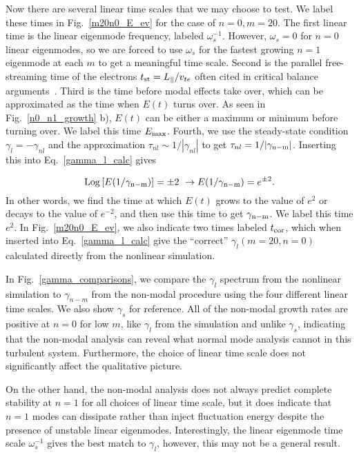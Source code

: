 \documentclass[letter,scriptaddress,twocolumn, prl,showkeys]{revtex4}
\def\beq{\begin{equation}}
\def\eeq{\end{equation}}
\def\para{\parallel}
\begin{document}
Now there are several linear time scales that we may choose to test. We label these times in Fig.~\ref{m20n0_E_ev}
for the case of $n=0, m=20$. The first linear time is the linear eigenmode frequency, labeled
$\omega_s^{-1}$. However, $\omega_s = 0$ for $n=0$ linear eigenmodes, so we are forced to use $\omega_s$ for the fastest growing $n=1$ eigenmode at each $m$ to get a meaningful time scale.
Second is the parallel free-streaming time of the electrons $t_{\rm{st}} = L_\para/v_{t e}$ often cited in critical balance arguments~\cite{barnes2011}. Third is the time before modal effects
take over, which can be approximated as the time when $E(t)$ turns over. As seen in Fig.~\ref{n0_n1_growth} b), $E(t)$ can be either a maximum or minimum before turning over. 
We label this time $E_{\rm{max}}$. 
Fourth, we use the steady-state condition $\gamma_l = - \gamma_{nl}$ and the approximation $\tau_{nl} \sim 1/|\gamma_{nl}|$ to get $\tau_{nl} = 1/|\gamma_{\rm{n-m}}|$. 
Inserting this into Eq.~\ref{gamma_l_calc} gives

\beq
\label{fourth_gamma_cond}
 {\rm{Log}} \left[ E(1/\gamma_{\rm{n-m}})\right] = \pm 2 \ \rightarrow E(1/\gamma_{\rm{n-m}}) = e^{\pm 2}.
\eeq
In other words, we find the time at which $E(t)$ grows to the value of $e^2$ or decays to the value of $e^{-2}$, and then use this time to get $\gamma_{\rm{n-m}}$. We label this time $e^2$. 
In Fig.~\ref{m20n0_E_ev},
we also indicate two times labeled $t_{\rm{cor}}$, which when inserted into Eq.~\ref{gamma_l_calc} give the ``correct'' $\gamma_l(m=20,n=0)$ calculated directly from the nonlinear simulation.

In Fig.~\ref{gamma_comparisons}, we compare the $\gamma_{l}$ spectrum from the nonlinear simulation to $\gamma_{n-m}$ from the non-modal procedure using the four different linear time scales. We also show
$\gamma_s$ for reference. All of the non-modal growth rates are positive at $n=0$ for low $m$, like $\gamma_l$ from the simulation and unlike $\gamma_s$, indicating that the non-modal analysis can reveal
what normal mode analysis cannot in this turbulent system. Furthermore, the choice of linear time scale does not significantly affect the qualitative picture. 

On the other hand, the non-modal analysis does not always
predict complete stability at $n=1$ for all choices of linear time scale, but it does indicate that $n=1$ modes can dissipate rather than inject fluctuation energy despite the presence of unstable
linear eigenmodes. Interestingly, the linear eigenmode time scale $\omega_s^{-1}$ gives the best match to $\gamma_l$, however, this may not be a general result.
\end{document}
